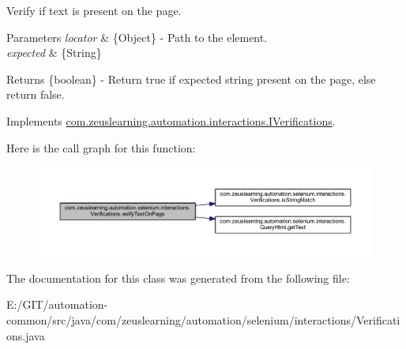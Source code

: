 Verify if text is present on the page.


\begin{DoxyParams}{Parameters}
{\em locator} & \{Object\} -\/ Path to the element. \\
\hline
{\em expected} & \{String\} \\
\hline
\end{DoxyParams}
\begin{DoxyReturn}{Returns}
\{boolean\} -\/ Return {\ttfamily true} if expected string present on the page, else return {\ttfamily false}. 
\end{DoxyReturn}


Implements \hyperlink{interfacecom_1_1zeuslearning_1_1automation_1_1interactions_1_1IVerifications_a2947831d2ac8783dd93e5fec4c33ebdd}{com.\+zeuslearning.\+automation.\+interactions.\+I\+Verifications}.

Here is the call graph for this function\+:
\nopagebreak
\begin{figure}[H]
\begin{center}
\leavevmode
\includegraphics[width=350pt]{d2/d6b/classcom_1_1zeuslearning_1_1automation_1_1selenium_1_1interactions_1_1Verifications_a041fe10631722deb8bd5f5f20760cd0c_cgraph}
\end{center}
\end{figure}


The documentation for this class was generated from the following file\+:\begin{DoxyCompactItemize}
\item 
E\+:/\+G\+I\+T/automation-\/common/src/java/com/zeuslearning/automation/selenium/interactions/Verifications.\+java\end{DoxyCompactItemize}
